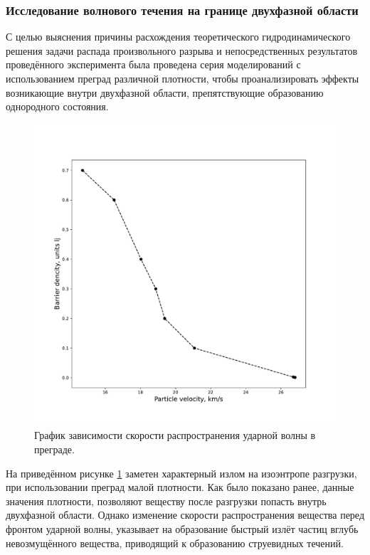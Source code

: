 \subsubsection{Исследование волнового течения на границе двухфазной области}

С целью выяснения причины расхождения теоретического гидродинамического решения задачи распада произвольного разрыва и непосредственных результатов проведённого эксперимента была проведена серия моделирований с использованием преград различной плотности, чтобы проанализировать эффекты возникающие внутри двухфазной области, препятствующие образованию однородного состояния. 

\begin{figure}[ht]
    \includegraphics[width=\linewidth]{img/speed_comp.pdf}
    \caption{\label{fig:speed} График зависимости скорости распространения ударной волны в преграде.}
\end{figure}

На приведённом рисунке \ref{fig:speed} заметен характерный излом на изоэнтропе разгрузки, при использовании преград малой плотности. Как было показано ранее, данные значения плотности, позволяют веществу после разгрузки попасть внутрь двухфазной области. Однако изменение скорости распространения вещества перед фронтом ударной волны, указывает на образование быстрый излёт частиц вглубь невозмущённого вещества, приводящий к образованию струевидных течений. 